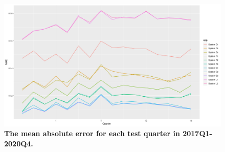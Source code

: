 \begin{figure}[ht]
\begin{center}
\includegraphics[scale=0.4]{./images/mae_16windows}
\caption{{\bf The mean absolute error for each test quarter in 2017Q1-2020Q4.}\setlength{\baselineskip}{1.25em}}
\label{fig_errors_mae}
\end{center}
\end{figure}